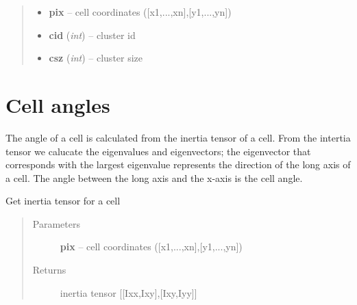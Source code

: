 \documentclass[letterpaper,10pt,english]{sphinxmanual}
\begin{document}
\begin{fulllineitems}
\begin{fulllineitems}
\begin{quote}
\begin{description}
\begin{itemize}
\item {} 
\textbf{pix} -- cell coordinates ({[}x1,...,xn{]},{[}y1,...,yn{]})

\item {} 
\textbf{cid} (\emph{int}) -- cluster id

\item {} 
\textbf{csz} (\emph{int}) -- cluster size

\end{itemize}

\end{description}\end{quote}

\end{fulllineitems}


\end{fulllineitems}



\section{Cell angles}
\label{AnalysisUtils:cell-angles}
The angle of a cell is calculated from the inertia tensor of a cell. From the intertia tensor we calucate the eigenvalues and eigenvectors; the eigenvector that corresponds with the largest eigenvalue represents the direction of the long axis of a cell. The angle between the long axis and the x-axis is the cell angle.

\begin{fulllineitems}
\label{AnalysisUtils:AnalysisUtils.getCellInertiaTensor}
Get inertia tensor for a cell
\begin{quote}\begin{description}
\item[{Parameters}] \leavevmode
\textbf{pix} -- cell coordinates ({[}x1,...,xn{]},{[}y1,...,yn{]})

\item[{Returns}] \leavevmode
inertia tensor {[}{[}Ixx,Ixy{]},{[}Ixy,Iyy{]}{]}

\end{description}\end{quote}

\end{fulllineitems}

\end{document}
